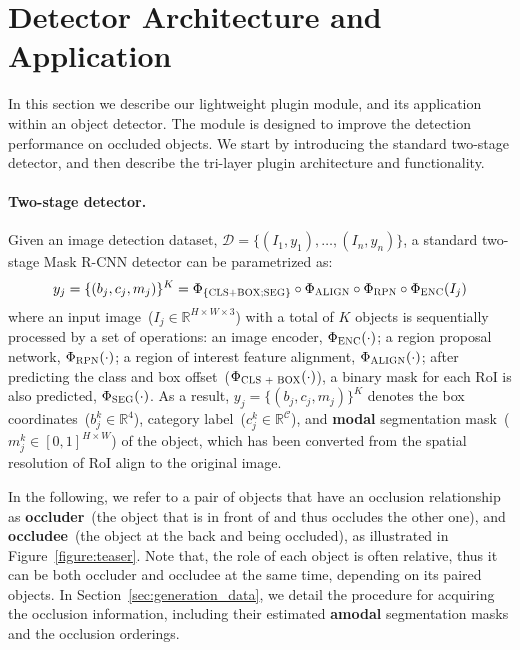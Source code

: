 \documentclass{bmvc2k}
\begin{document}
\section{Detector Architecture and Application}
\vspace{-0.1cm}

In this section we describe our lightweight plugin module, and its application within an object detector. The module is designed to improve the detection performance on occluded objects.
We start by introducing the standard two-stage detector, and then describe the tri-layer plugin architecture and functionality.

\vspace{-0.4cm}
\paragraph{Two-stage detector.} 

Given an image detection dataset, $\mathcal{D} = \{(I_1, y_1), \dots, (I_n, y_n)\}$, 
a standard two-stage Mask R-CNN detector can be parametrized as:
\begin{align}
y_j = \{(b_j, c_j, m_j)\}^K = \Phi_{\{\textsc{CLS+BOX;SEG}\}} \circ \Phi_{\textsc{ALIGN}} \circ  \Phi_{\textsc{RPN}} \circ  \Phi_{\textsc{ENC}}(I_j)
\end{align}
where an input image~($I_j \in \mathbb{R}^{H \times W \times 3}$) with a total of $K$ objects is sequentially processed by a set of operations: 
an image encoder, $\Phi_{\textsc{ENC}}(\cdot)$; 
a region proposal network, $\Phi_{\textsc{RPN}}(\cdot)$; 
a region of interest feature alignment, $\Phi_{\textsc{ALIGN}}(\cdot)$;
after predicting the class and box offset~($\Phi_{\textsc{CLS + BOX}}(\cdot)$),
a binary mask for each RoI is also predicted, $\Phi_{\textsc{SEG}}(\cdot)$.
As a result, $y_j = \{(b_j, c_j, m_j)\}^K$ denotes the box coordinates~($b^k_j \in \mathbb{R}^4$),
category label~($c^k_j \in \mathbb{R}^{\mathcal{C}}$),
and \textbf{modal} segmentation mask~($m^k_j \in [0,1]^{H \times W}$) of the object,
which has been converted from the spatial resolution of RoI align to the original image.


In the following, we refer to a pair of objects that
have an occlusion relationship as  \textbf{occluder}~(the object that is in front of and thus occludes the other one), and  \textbf{occludee}~(the object at the back and being occluded), as illustrated in Figure~\ref{figure:teaser}.
Note that, the role of each object is often relative, 
thus it can be both occluder and occludee at the same time, depending on its paired objects. In Section~\ref{sec:generation_data}, we detail the procedure for acquiring the occlusion information,
including their estimated \textbf{amodal} segmentation masks and the occlusion orderings.
\end{document}
